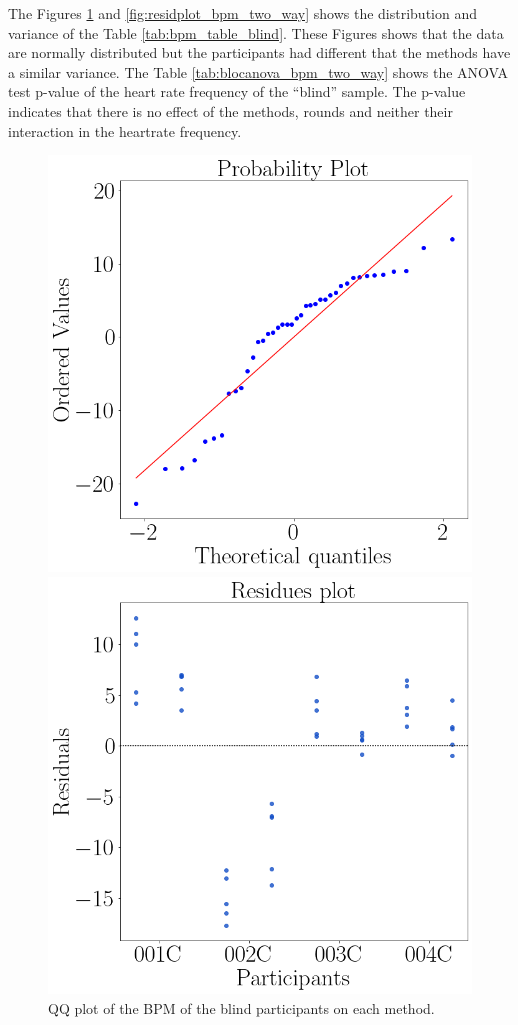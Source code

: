 The Figures \ref{fig:qqplot_bpm_two_way} and \ref{fig:residplot_bpm_two_way} shows the distribution and variance of the Table \ref{tab:bpm_table_blind}. These Figures shows that the data are normally distributed but the participants had different  that the methods have a similar variance.
The Table \ref{tab:blocanova_bpm_two_way} shows the ANOVA test p-value of the heart rate frequency of the “blind” sample. The p-value indicates that there is no effect of the methods, rounds and neither their interaction in the heartrate frequency.



\begin{figure}[!htb]
    \centering
    \begin{minipage}{0.45\textwidth}
        \centering
        \includegraphics[width = 0.8\linewidth]{Resultados/ECG/Figuras/png/qqplot_bpm_two_way.png}
        \caption{QQ plot of the BPM of the blind participants on each method.}
        \label{fig:qqplot_bpm_two_way}
    \end{minipage}
    \begin{minipage}{0.45\textwidth}
        \centering
        \includegraphics[width = 0.8\linewidth]{Resultados/ECG/Figuras/png/residplot_bpm_two_way.png}

\end{minipage}
\end{figure}
